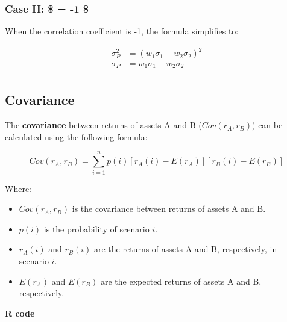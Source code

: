 \documentclass[
]{book}
\providecommand{\tightlist}{%
  \setlength{\itemsep}{0pt}\setlength{\parskip}{0pt}}
\begin{document}
\hypertarget{case-ii--1}{%
\subsubsection{\texorpdfstring{Case II: \$ \rho = -1
\$}{Case II: \$ = -1 \$}}\label{case-ii--1}}

When the correlation coefficient is -1, the formula simplifies to:

\[
\begin{aligned}
\sigma_P^2 &= (w_1 \sigma_1 - w_2 \sigma_2)^2 \\
\sigma_P  &= w_1 \sigma_1 - w_2 \sigma_2 \\
\end{aligned}
\]

\hypertarget{covariance}{%
\subsection{Covariance}\label{covariance}}

The \textbf{covariance} between returns of assets A and B
(\(Cov(r_A, r_B)\)) can be calculated using the following formula:

\[Cov(r_A, r_B) = \sum_{i=1}^{n} p(i)[r_A(i) - E(r_A)][r_B(i) - E(r_B)]\]

Where:

\begin{itemize}
\tightlist
\item
  \(Cov(r_A, r_B)\) is the covariance between returns of assets A and B.
\item
  \(p(i)\) is the probability of scenario \(i\).
\item
  \(r_A(i)\) and \(r_B(i)\) are the returns of assets A and B,
  respectively, in scenario \(i\).
\item
  \(E(r_A)\) and \(E(r_B)\) are the expected returns of assets A and B,
  respectively.
\end{itemize}

\textbf{R code}
\end{document}
